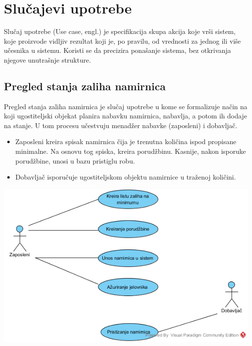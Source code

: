 \documentclass{article}
\begin{document}
\section{Slučajevi upotrebe}

Slučaj upotrebe (Use case, engl.) je specifikacija skupa akcija koje vrši sistem, koje proizvode vidljiv rezultat koji je, po pravilu, od vrednosti za jednog ili više učesnika u sistemu. Koristi se da precizira ponašanje sistema, bez otkrivanja njegove unutrašnje strukture.


\subsection{Pregled stanja zaliha namirnica}
Pregled stanja zaliha namirnica je slučaj upotrebe u kome se formalizuje način na koji ugostiteljski objekat planira nabavku namirnica, nabavlja, a potom ih dodaje na stanje. U tom procesu učestvuju menadžer nabavke (zaposleni) i dobavljač. 

\begin{itemize}
\item Zaposleni kreira spisak namirnica čija je trenutna količina ispod propisane minimalne. Na osnovu tog spiska, kreira porudžbinu. Kasnije, nakon isporuke porudžbine, unosi u bazu pristiglu robu.
\item Dobavljač isporučuje ugostiteljskom objektu namirnice u traženoj količini.
\end{itemize}
\includegraphics[width=\textwidth]{SU_1_zalihe.png}
\end{document}
